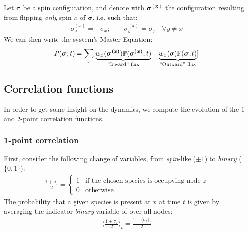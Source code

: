 \documentclass[../../main.tex]{subfiles}
\begin{document}
Let $\bm{\sigma}$ be a spin configuration, and denote with $\bm{\sigma^{(x)}}$ the configuration resulting from flipping \textit{only} spin $x$ of $\bm{\sigma}$, i.e. such that:
\begin{align*}
    \sigma_x^{(x)} = -\sigma_x; \qquad \sigma_y^{(x)} = \sigma_y \quad \forall y \neq x
\end{align*} 
We can then write the system's Master Equation:
\begin{align}\label{eqn:voting-ME}
    \dot{P}(\bm{\sigma};t) = \sum_x [\underbrace{w_x(\bm{\sigma^{(x)}}) \mathbb{P}(\bm{\sigma^{(x)}}; t)}_{\text{``Inward'' flux}}  - \underbrace{w_x(\bm{\sigma}) \mathbb{P}(\bm{\sigma}; t)}_{\text{``Outward'' flux}} ]
\end{align}


\subsection{Correlation functions}
In order to get some insight on the dynamics, we compute the evolution of the $1$ and $2$-point correlation functions.

\subsubsection{1-point correlation}

First, consider the following change of variables, from \textit{spin}-like ($\pm 1$) to \textit{binary} ($\{0,1\}$):
\begin{align}\label{eqn:presence-indicator}
    \frac{1+\sigma_z}{2} = \begin{cases}
        1 & \text{if the chosen species is occupying node $z$}\\
        0 & \text{otherwise}
    \end{cases} 
\end{align}  
The probability that a given species is present at $x$ at time $t$ is given by averaging the indicator \textit{binary} variable of  over all nodes:
\begin{align*}
    \langle \frac{1+ \sigma_z}{2}  \rangle_t = \frac{1+\langle \sigma_z \rangle_t}{2} 
\end{align*}
\end{document}
